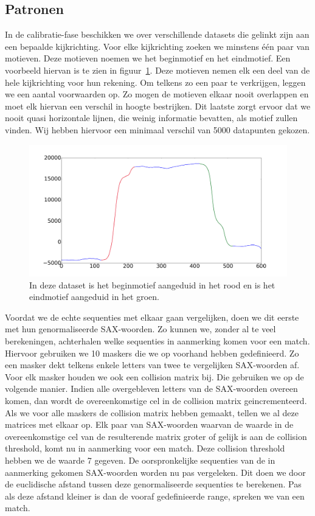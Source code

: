 \documentclass{article}
\begin{document}
\subsection{Patronen}

In de calibratie-fase beschikken we over verschillende datasets die gelinkt zijn aan een bepaalde kijkrichting. Voor elke kijkrichting zoeken we minstens één paar van motieven. Deze motieven noemen we het beginmotief en het eindmotief. Een voorbeeld hiervan is te zien in figuur~\ref{fig:beginend}. Deze motieven nemen elk een deel van de hele kijkrichting voor hun rekening. Om telkens zo een paar te verkrijgen, leggen we een aantal voorwaarden op. Zo mogen de motieven elkaar nooit overlappen en moet elk hiervan een verschil in hoogte bestrijken. Dit laatste zorgt ervoor dat we nooit quasi horizontale lijnen, die weinig informatie bevatten, als motief zullen vinden. Wij hebben hiervoor een minimaal verschil van 5000 datapunten gekozen.

\begin{figure}[h]
\centering
\includegraphics[width=\linewidth]{images/motif_begin_end}
\caption{In deze dataset is het beginmotief aangeduid in het rood en is het eindmotief aangeduid in het groen.}
\label{fig:beginend}
\end{figure}

Voordat we de echte sequenties met elkaar gaan vergelijken, doen we dit eerste met hun genormaliseerde SAX-woorden. Zo kunnen we, zonder al te veel berekeningen, achterhalen welke sequenties in aanmerking komen voor een match. Hiervoor gebruiken we 10 maskers die we op voorhand hebben gedefinieerd. Zo een masker dekt telkens enkele letters van twee te vergelijken SAX-woorden af. Voor elk masker houden we ook een collision matrix bij. Die gebruiken we op de volgende manier. Indien alle overgebleven letters van de SAX-woorden overeen komen, dan wordt de overeenkomstige cel in de collision matrix geincrementeerd. Als we voor alle maskers de collision matrix hebben gemaakt, tellen we al deze matrices met elkaar op. Elk paar van SAX-woorden waarvan de waarde in de overeenkomstige cel van de resulterende matrix groter of gelijk is aan de collision threshold, komt nu in aanmerking voor een match. Deze collision threshold hebben we de waarde 7 gegeven. De oorspronkelijke sequenties van de in aanmerking gekomen SAX-woorden worden nu pas vergeleken. Dit doen we door de euclidische afstand tussen deze genormaliseerde sequenties te berekenen. Pas als deze afstand kleiner is dan de vooraf gedefinieerde range, spreken we van een match.
\end{document}
